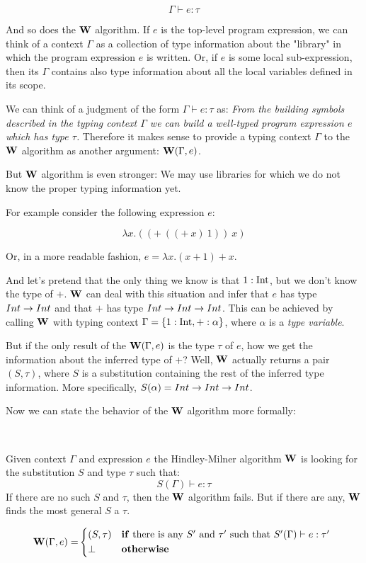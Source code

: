 \documentclass[a4paper,oneside]{memoir}
\begin{document}
$$\Gamma \vdash e : \tau$$

And so does the $\operatorname{\textbf{W}}$ algorithm.
If $e$ is the top-level program expression,
we can think of a context $\Gamma$ as a collection of type information about the "library"
in which the program expression $e$ is written.
Or, if $e$ is some local sub-expression, then its $\Gamma$ contains also type information about
all the local variables defined in its scope.

We can think of a judgment of the form $\Gamma \vdash e : \tau$ as: 
\textit{From the building symbols described in the typing context $\Gamma$ we can build 
a well-typed program expression $e$ which has type $\tau$.}
Therefore it makes sense to provide a typing context $\Gamma$ to the $\operatorname{\textbf{W}}$ algorithm as another argument: $\operatorname{\textbf{W}}(\Gamma, e)$.

But $\operatorname{\textbf{W}}$ algorithm is even stronger: We may use libraries for which we do not know the proper typing information yet.

For example consider the following expression $e$:

$$ \lambda x . ((+~((+~x)~1))~x) $$

Or, in a more readable fashion, $e = \lambda x . (x+1)+x $.


And let's pretend that the only thing we know is that $1 : \operatorname{Int}$, 
but we don't know the type of $+$. 
$\operatorname{\textbf{W}}$ can deal with this situation and infer that $e$ has type $Int \rightarrow Int$ and
that $+$ has type $Int \rightarrow Int \rightarrow Int$. This can be achieved by calling $\operatorname{\textbf{W}}$ with
typing context $\Gamma = \{ 1 : \operatorname{Int}, + : \alpha \}$, 
where $\alpha$ is a \textit{type variable}.

But if the only result of the $\operatorname{\textbf{W}}(\Gamma,e)$ is the type $\tau$ of $e$, 
how we get the information about the inferred type of $+$? 
Well, $\operatorname{\textbf{W}}$ actually returns a pair $(S, \tau)$, where $S$ is a substitution
containing the rest of the inferred type information. 
More specifically, $S(\alpha) = Int \rightarrow Int \rightarrow Int$.  

Now we can state the behavior of the $\operatorname{\textbf{W}}$ algorithm more formally:

~

Given context $\Gamma$ and expression $e$ the Hindley-Milner algorithm $\operatorname{\textbf{W}}$ 
is looking for the substitution $S$ and type $\tau$ such that: 
$$ S(\Gamma) \vdash e : \tau $$
If there are no such $S$ and $\tau$, then the $\operatorname{\textbf{W}}$ algorithm fails.
But if there are any, $\operatorname{\textbf{W}}$ finds the most general $S$ a $\tau$.


\begin{align*}
\W(\Gamma, e) = &
\begin{cases*}
  (S, \tau) 
  & \textbf{if} there is any $\SPr$ and $\tauPr$ such that $S^\prime(\Gamma) \vdash e : \tauPr$  \\
  \bot & \textbf{otherwise}
\end{cases*}\\
\end{align*}
\end{document}
